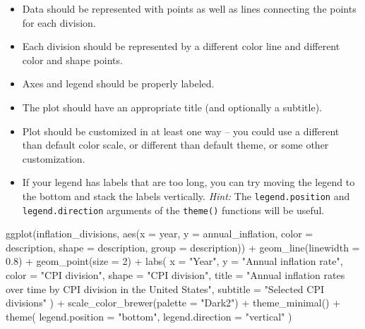 \documentclass[
  letterpaper,
  DIV=11,
  numbers=noendperiod]{scrartcl}
\newenvironment{Shaded}{\begin{snugshade}}{\end{snugshade}}
\newcommand{\AttributeTok}[1]{\textcolor[rgb]{0.40,0.45,0.13}{#1}}
\newcommand{\DecValTok}[1]{\textcolor[rgb]{0.68,0.00,0.00}{#1}}
\newcommand{\FloatTok}[1]{\textcolor[rgb]{0.68,0.00,0.00}{#1}}
\newcommand{\FunctionTok}[1]{\textcolor[rgb]{0.28,0.35,0.67}{#1}}
\newcommand{\NormalTok}[1]{\textcolor[rgb]{0.00,0.23,0.31}{#1}}
\newcommand{\SpecialCharTok}[1]{\textcolor[rgb]{0.37,0.37,0.37}{#1}}
\newcommand{\StringTok}[1]{\textcolor[rgb]{0.13,0.47,0.30}{#1}}
\providecommand{\tightlist}{%
  \setlength{\itemsep}{0pt}\setlength{\parskip}{0pt}}
\begin{document}
\begin{itemize}
\tightlist
\item
  Data should be represented with points as well as lines connecting the
  points for each division.
\item
  Each division should be represented by a different color line and
  different color and shape points.
\item
  Axes and legend should be properly labeled.
\item
  The plot should have an appropriate title (and optionally a subtitle).
\item
  Plot should be customized in at least one way -- you could use a
  different than default color scale, or different than default theme,
  or some other customization.
\item
  If your legend has labels that are too long, you can try moving the
  legend to the bottom and stack the labels vertically. \emph{Hint:} The
  \texttt{legend.position} and \texttt{legend.direction} arguments of
  the \texttt{theme()} functions will be useful.
\end{itemize}

\begin{Shaded}
\begin{Highlighting}[]
\FunctionTok{ggplot}\NormalTok{(inflation\_divisions, }
       \FunctionTok{aes}\NormalTok{(}\AttributeTok{x =}\NormalTok{ year, }\AttributeTok{y =}\NormalTok{ annual\_inflation,}
           \AttributeTok{color =}\NormalTok{ description, }\AttributeTok{shape =}\NormalTok{ description, }\AttributeTok{group =}\NormalTok{ description)) }\SpecialCharTok{+}
  \FunctionTok{geom\_line}\NormalTok{(}\AttributeTok{linewidth =} \FloatTok{0.8}\NormalTok{) }\SpecialCharTok{+}
  \FunctionTok{geom\_point}\NormalTok{(}\AttributeTok{size =} \DecValTok{2}\NormalTok{) }\SpecialCharTok{+}
  \FunctionTok{labs}\NormalTok{(}
    \AttributeTok{x =} \StringTok{"Year"}\NormalTok{,}
    \AttributeTok{y =} \StringTok{"Annual inflation rate"}\NormalTok{,}
    \AttributeTok{color =} \StringTok{"CPI division"}\NormalTok{,}
    \AttributeTok{shape =} \StringTok{"CPI division"}\NormalTok{,}
    \AttributeTok{title =} \StringTok{"Annual inflation rates over time by CPI division in the United States"}\NormalTok{,}
    \AttributeTok{subtitle =} \StringTok{"Selected CPI divisions"}
\NormalTok{  ) }\SpecialCharTok{+}
  \FunctionTok{scale\_color\_brewer}\NormalTok{(}\AttributeTok{palette =} \StringTok{"Dark2"}\NormalTok{) }\SpecialCharTok{+}
  \FunctionTok{theme\_minimal}\NormalTok{() }\SpecialCharTok{+}
  \FunctionTok{theme}\NormalTok{(}
    \AttributeTok{legend.position =} \StringTok{"bottom"}\NormalTok{,}
    \AttributeTok{legend.direction =} \StringTok{"vertical"}
\NormalTok{  )}
\end{Highlighting}
\end{Shaded}
\end{document}
